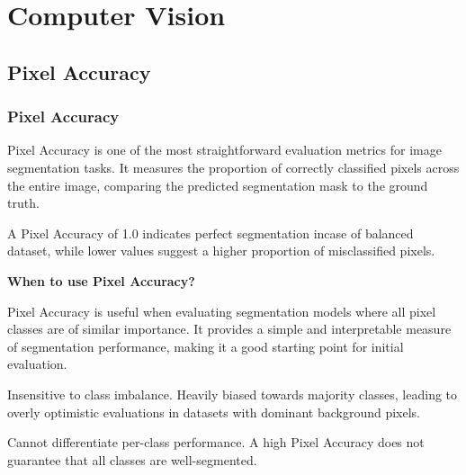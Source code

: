 \chapter{Computer Vision}

\clearpage
\thispagestyle{cvstyle}
\section{Pixel Accuracy}
\subsection{Pixel Accuracy}


Pixel Accuracy is one of the most straightforward evaluation metrics for image segmentation tasks. It measures the proportion
of correctly classified pixels across the entire image, comparing the predicted segmentation mask to the ground truth.

\noindent
{}
\vspace{-0.5\baselineskip} %

A Pixel Accuracy of 1.0 indicates perfect segmentation incase of balanced dataset, while lower values suggest a higher proportion of misclassified pixels.


\textbf{When to use Pixel Accuracy?}

Pixel Accuracy is useful when evaluating segmentation models where all pixel classes are of similar importance.
It provides a simple and interpretable measure of segmentation performance, making it a good starting point for initial
evaluation.

{
\item Insensitive to class imbalance. Heavily biased towards majority classes, leading to overly optimistic
evaluations in datasets with dominant background pixels.
\item Cannot differentiate per-class performance. A high Pixel Accuracy does not guarantee that all classes are well-segmented.
}

